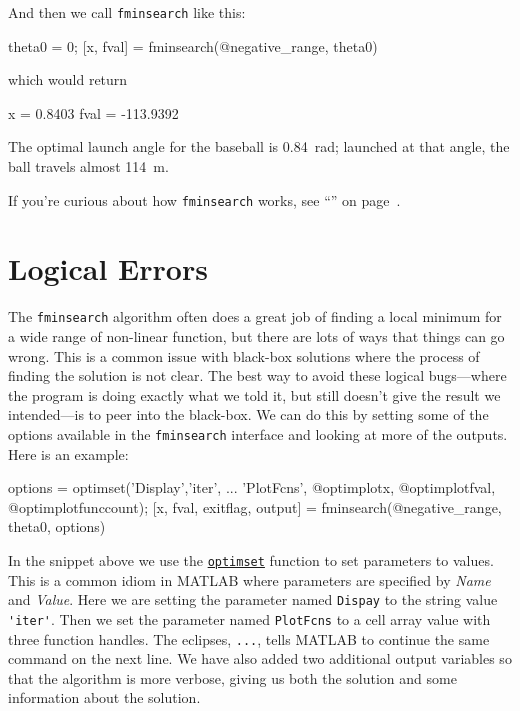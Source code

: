 And then we call \lstinline{fminsearch} like this:

\begin{code}
    theta0 = 0;
    [x, fval] = fminsearch(@negative_range, theta0)
\end{code}
which would return
\begin{code}
    x =
    0.8403
fval =
 -113.9392
\end{code}

The optimal launch angle for the baseball is \SI{0.84}{\radian}; launched at that angle, the ball travels almost \SI{114}{\meter}.

If you're curious about how \lstinline{fminsearch} works, see ``'' on page~\pageref{howfminsearch}.

\section{Logical Errors}

The \lstinline{fminsearch} algorithm often does a great job of finding a local minimum for a wide range of non-linear function, but there are lots of ways that things can go wrong.  This is a common issue with black-box solutions where the process of finding the solution is not clear.   The best way to avoid these logical bugs---where the program is doing exactly what we told it, but still doesn't give the result we intended---is to peer into the black-box. We can do this by setting some of the options available in the \lstinline{fminsearch} interface and looking at more of the outputs.  Here is an example:

\begin{code}
    options = optimset('Display','iter', ...
        'PlotFcns', {@optimplotx, @optimplotfval, @optimplotfunccount});
    [x, fval, exitflag, output] = fminsearch(@negative_range, theta0, options)
\end{code}

In the snippet above we use the \href{https://www.mathworks.com/help/matlab/ref/optimset.html}{\lstinline{optimset}} function to set parameters to values.  This is a common idiom in MATLAB where parameters are specified by \emph{Name} and \emph{Value}.  Here we are setting the parameter named \lstinline{Dispay} to the string value \lstinline{'iter'}.  Then we set the parameter named \lstinline{PlotFcns} to a cell array value with three function handles.  The eclipses, \lstinline{...}, tells MATLAB to continue the same command on the next line.  We have also added two additional output variables so that the algorithm is more verbose, giving us both the solution and some information about the solution.


